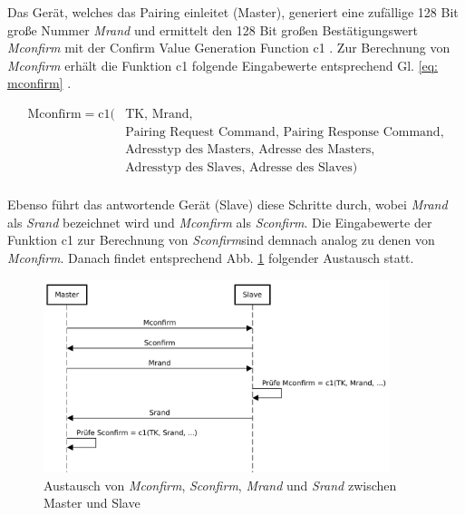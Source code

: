 Das Gerät, welches das Pairing einleitet (Master), generiert eine zufällige 128 Bit große Nummer \textit{Mrand} und ermittelt den 128 Bit großen Bestätigungswert \textit{Mconfirm} mit der Confirm Value Generation Function c1 \cite{BtSpec4.2_2288}. 
Zur Berechnung von \textit{Mconfirm} erhält die Funktion c1 folgende Eingabewerte entsprechend Gl. \ref{eq: mconfirm} \cite{BtSpec4.2_2305-2306}.

\begin{equation}
\begin{split}
    \text{Mconfirm} = \text{c1}(& \text{TK, Mrand,} \\
    & \text{Pairing Request Command, Pairing Response Command,} \\
    & \text{Adresstyp des Masters, Adresse des Masters,} \\
    & \text{Adresstyp des Slaves, Adresse des Slaves}) \\
\end{split}
    \label{eq: mconfirm}
\end{equation}

Ebenso führt das antwortende Gerät (Slave) diese Schritte durch, wobei \textit{Mrand} als \textit{Srand} bezeichnet wird und \textit{Mconfirm} als \textit{Sconfirm}. Die Eingabewerte der Funktion c1 zur Berechnung von \textit{Sconfirm}sind demnach analog zu denen von \textit{Mconfirm}. Danach findet entsprechend Abb. \ref{fig: austausch vor stk generierung} folgender Austausch statt.

\begin{figure}[H]
    \centering
    \includegraphics[width=0.9\textwidth]{graphics/austausch_vor_stk_generierung.pdf}
    \caption[Austausch von \textit{Mconfirm}, \textit{Sconfirm}, \textit{Mrand} und \textit{Srand} zwischen Master und Slave]{Austausch von \textit{Mconfirm}, \textit{Sconfirm}, \textit{Mrand} und \textit{Srand} zwischen Master und Slave \cite{BtSpec4.2_2305-2306}}
    \label{fig: austausch vor stk generierung}
\end{figure}

